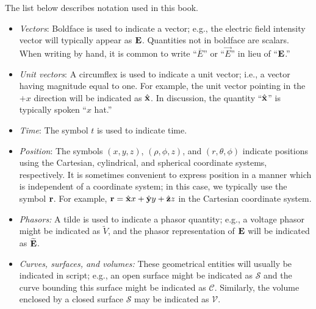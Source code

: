 

\label{m0005_Notation} %

The list below describes notation used in this book. 
%
\begin{itemize}
\item \emph{Vectors}: Boldface is used to indicate a vector; e.g., the electric field intensity vector will typically appear as ${\bf E}$.  Quantities not in boldface are scalars.  When writing by hand, it is common to write ``$\overline{E}$'' or ``$\overrightarrow{E}$'' in lieu of ``${\bf E}$.''
\item \emph{Unit vectors}: A circumflex is used to indicate a unit vector; i.e., a vector having magnitude equal to one.  For example, the unit vector pointing in the $+x$ direction will be indicated as $\hat{\bf x}$.  In discussion, the quantity ``$\hat{\bf x}$'' is typically spoken ``$x$ hat.'' 
\item \emph{Time}: The symbol $t$ is used to indicate time. 
\item \emph{Position}: The symbols $(x,y,z)$, $(\rho,\phi,z)$, and $(r,\theta,\phi)$ indicate positions using the Cartesian, cylindrical, and spherical coordinate systems, respectively.  It is sometimes convenient to express position in a manner which is independent of a coordinate system; in this case, we typically use the symbol ${\bf r}$. For example, ${\bf r}=\hat{\bf x}x+\hat{\bf y}y+\hat{\bf z}z$ in the Cartesian coordinate system.
\item \emph{Phasors:}  A tilde is used to indicate a phasor quantity; e.g., a voltage phasor might be indicated as $\widetilde{V}$, and the phasor representation of ${\bf E}$ will be indicated as $\widetilde{{\bf E}}$.
\item \emph{Curves, surfaces, and volumes:} These geometrical entities will usually be indicated in script; e.g., an open surface might be indicated as $\mathcal{S}$ and the curve bounding this surface might be indicated as $\mathcal{C}$.  Similarly, the volume enclosed by a closed surface $\mathcal{S}$ may be indicated as $\mathcal{V}$.

\end{itemize}

